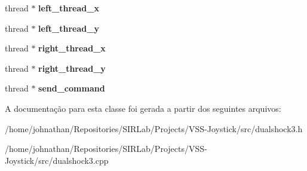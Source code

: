 \begin{DoxyCompactItemize}
\item 
thread $\ast$ {\bfseries left\+\_\+thread\+\_\+x}\hypertarget{classDualshock3_a8122a2a86264008db534909fc0a9f549}{}\label{classDualshock3_a8122a2a86264008db534909fc0a9f549}

\item 
thread $\ast$ {\bfseries left\+\_\+thread\+\_\+y}\hypertarget{classDualshock3_a9298120b4eeaed6964f52d41a50dc70a}{}\label{classDualshock3_a9298120b4eeaed6964f52d41a50dc70a}

\item 
thread $\ast$ {\bfseries right\+\_\+thread\+\_\+x}\hypertarget{classDualshock3_a1442106afd023eee06fb3aef7026111c}{}\label{classDualshock3_a1442106afd023eee06fb3aef7026111c}

\item 
thread $\ast$ {\bfseries right\+\_\+thread\+\_\+y}\hypertarget{classDualshock3_aefbc99ae185e7cfa4c62ab2bb531fccf}{}\label{classDualshock3_aefbc99ae185e7cfa4c62ab2bb531fccf}

\item 
thread $\ast$ {\bfseries send\+\_\+command}\hypertarget{classDualshock3_af81976449fec2bb88e6cdc843d2456c0}{}\label{classDualshock3_af81976449fec2bb88e6cdc843d2456c0}

\end{DoxyCompactItemize}


A documentação para esta classe foi gerada a partir dos seguintes arquivos\+:\begin{DoxyCompactItemize}
\item 
/home/johnathan/\+Repositories/\+S\+I\+R\+Lab/\+Projects/\+V\+S\+S-\/\+Joystick/src/dualshock3.\+h\item 
/home/johnathan/\+Repositories/\+S\+I\+R\+Lab/\+Projects/\+V\+S\+S-\/\+Joystick/src/dualshock3.\+cpp\end{DoxyCompactItemize}
